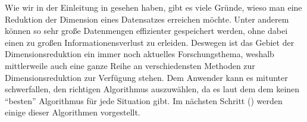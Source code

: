 Wie wir in der Einleitung in  gesehen haben, gibt es viele Gründe, wieso man
eine Reduktion der Dimension eines Datensatzes erreichen möchte. Unter anderem können so sehr große
Datenmengen effizienter gespeichert werden, ohne dabei einen zu großen Informationensverlust zu
erleiden. Deswegen ist das Gebiet der Dimensionsreduktion ein immer noch aktuelles Forschungsthema,
weshalb mittlerweile auch eine ganze Reihe an verschiedensten Methoden zur Dimensionsreduktion zur
Verfügung stehen. Dem Anwender kann es mitunter schwerfallen, den richtigen Algorithmus
auszuwählen, da es laut dem dem  \parencite{Wolpert.1997} keinen \enquote{besten} Algorithmus für jede Situation gibt. Im nächsten
Schritt () werden einige dieser Algorithmen vorgestellt.

